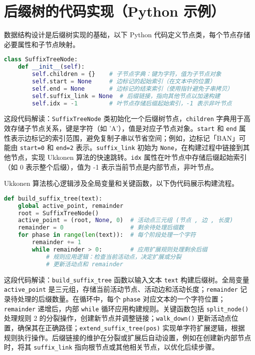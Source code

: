 \chapter{后缀树的代码实现（Python 示例）}
数据结构设计是后缀树实现的基础，以下 Python 代码定义节点类，每个节点存储必要属性和子节点映射。\par
\begin{lstlisting}[language=python]
class SuffixTreeNode:
    def __init__(self):
        self.children = {}    # 子节点字典：键为字符，值为子节点对象
        self.start = None     # 边标记的起始索引（在文本中的位置）
        self.end = None       # 边标记的结束索引（使用指针避免子串拷贝）
        self.suffix_link = None  # 后缀链接，指向其他节点以加速构建
        self.idx = -1         # 叶节点存储后缀起始索引，-1 表示非叶节点
\end{lstlisting}
这段代码解读：\texttt{SuffixTreeNode} 类初始化一个后缀树节点，\texttt{children} 字典用于高效存储子节点关系，键是字符（如 'A'），值是对应子节点对象。\texttt{start} 和 \texttt{end} 属性表示边标记的索引范围，避免复制子串以节省空间；例如，边标记「BAN」可能由 \texttt{start=0} 和 \texttt{end=2} 表示。\texttt{suffix\_{}link} 初始为 \texttt{None}，在构建过程中链接到其他节点，实现 Ukkonen 算法的快速跳转。\texttt{idx} 属性在叶节点中存储后缀起始索引（如 0 表示整个后缀），值为 -1 表示当前节点是内部节点，非叶节点。\par
Ukkonen 算法核心逻辑涉及全局变量和关键函数，以下伪代码展示构建流程。\par
\begin{lstlisting}[language=python]
def build_suffix_tree(text):
    global active_point, remainder
    root = SuffixTreeNode()
    active_point = (root, None, 0)  # 活动点三元组 (节点 , 边 , 长度)
    remainder = 0                   # 剩余待处理后缀数
    for phase in range(len(text)):  # 每个阶段处理一个字符
        remainder += 1
        while remainder > 0:        # 应用扩展规则处理剩余后缀
            # 规则应用逻辑：检查当前活动点，决定扩展或分裂
            # 更新活动点和 remainder
\end{lstlisting}
这段代码解读：\texttt{build\_{}suffix\_{}tree} 函数以输入文本 \texttt{text} 构建后缀树。全局变量 \texttt{active\_{}point} 是三元组，存储当前活动节点、活动边和活动长度；\texttt{remainder} 记录待处理的后缀数量。在循环中，每个 \texttt{phase} 对应文本的一个字符位置；\texttt{remainder} 递增后，内部 \texttt{while} 循环应用构建规则。关键函数包括 \texttt{split\_{}node()} 处理规则 2 的分裂操作，创建新节点并调整链接；\texttt{walk\_{}down()} 更新活动点位置，确保其在正确路径；\texttt{extend\_{}suffix\_{}tree(pos)} 实现单字符扩展逻辑，根据规则执行操作。后缀链接的维护在分裂或扩展后自动设置，例如在创建新内部节点时，将其 \texttt{suffix\_{}link} 指向根节点或其他相关节点，以优化后续步骤。\par
